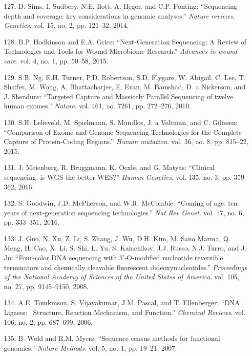 \documentclass[12pt,a4paper,twoside]{ugathesis}
\theoremstyle{definition}
\theoremstyle{definition}
\theoremstyle{definition}
\theoremstyle{remark}
\begin{document}
\hypertarget{ref-Sims2014}{}
127. D. Sims, I. Sudbery, N.E. Ilott, A. Heger, and C.P. Ponting:
``Sequencing depth and coverage: key considerations in genomic
analyses.'' \emph{Nature reviews. Genetics}. vol. 15, no. 2, pp.
121--32, 2014.

\hypertarget{ref-Hodkinson2015}{}
128. B.P. Hodkinson and E.A. Grice: ``Next-Generation Sequencing: A
Review of Technologies and Tools for Wound Microbiome Research.''
\emph{Advances in wound care}. vol. 4, no. 1, pp. 50--58, 2015.

\hypertarget{ref-Ng2010}{}
129. S.B. Ng, E.H. Turner, P.D. Robertson, S.D. Flygare, W. Abigail, C.
Lee, T. Shaffer, M. Wong, A. Bhattacharjee, E. Evan, M. Bamshad, D. a
Nickerson, and J. Shendure: ``Targeted Capture and Massicely Parallel
Sequencing of twelve human exomes.'' \emph{Nature}. vol. 461, no. 7261,
pp. 272--276, 2010.

\hypertarget{ref-Lelieveld2015}{}
130. S.H. Lelieveld, M. Spielmann, S. Mundlos, J. a Veltman, and C.
Gilissen: ``Comparison of Exome and Genome Sequencing Technologies for
the Complete Capture of Protein-Coding Regions.'' \emph{Human mutation}.
vol. 36, no. 8, pp. 815--22, 2015.

\hypertarget{ref-Meienberg2016}{}
131. J. Meienberg, R. Bruggmann, K. Oexle, and G. Matyas: ``Clinical
sequencing: is WGS the better WES?'' \emph{Human Genetics}. vol. 135,
no. 3, pp. 359--362, 2016.

\hypertarget{ref-Goodwin2016}{}
132. S. Goodwin, J.D. McPherson, and W.R. McCombie: ``Coming of age: ten
years of next-generation sequencing technologies.'' \emph{Nat Rev
Genet}. vol. 17, no. 6, pp. 333--351, 2016.

\hypertarget{ref-Guo2008}{}
133. J. Guo, N. Xu, Z. Li, S. Zhang, J. Wu, D.H. Kim, M. Sano Marma, Q.
Meng, H. Cao, X. Li, S. Shi, L. Yu, S. Kalachikov, J.J. Russo, N.J.
Turro, and J. Ju: ``Four-color DNA sequencing with 3'-O-modified
nucleotide reversible terminators and chemically cleavable fluorescent
dideoxynucleotides.'' \emph{Proceedings of the National Academy of
Sciences of the United States of America}. vol. 105, no. 27, pp.
9145--9150, 2008.

\hypertarget{ref-Tomkinson2006}{}
134. A.E. Tomkinson, S. Vijayakumar, J.M. Pascal, and T. Ellenberger:
``DNA Ligases:~ Structure, Reaction Mechanism, and Function.''
\emph{Chemical Reviews}. vol. 106, no. 2, pp. 687--699, 2006.

\hypertarget{ref-Wold2007}{}
135. B. Wold and R.M. Myers: ``Sequence census methods for functional
genomics.'' \emph{Nature Methods}. vol. 5, no. 1, pp. 19--21, 2007.
\end{document}
